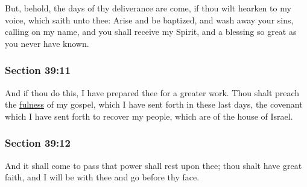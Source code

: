 		But, behold, the days of thy deliverance are come, if thou wilt hearken to my voice, which saith unto thee: Arise and be baptized, and wash away your sins, calling on my name, and you shall receive my Spirit, and a blessing so great as you never have known.


	\subsubsection{Section 39:11} %
		\label{DC39-11}

		And if thou do this, I have prepared thee for a greater work.  Thou shalt preach the \hyperref[FULNESS]{fulness} of my gospel, which I have sent forth in these last days, the covenant which I have sent forth to recover my people, which are of the house of Israel.


	\subsubsection{Section 39:12} %
		\label{DC39-12}

		And it shall come to pass that power shall rest upon thee; thou shalt have great faith, and I will be with thee and go before thy face.


